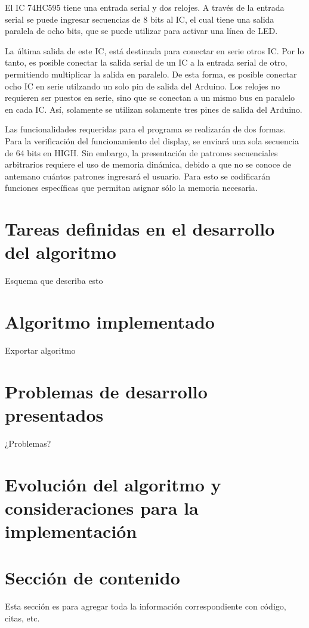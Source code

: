 \documentclass{article}
\begin{document}
El IC 74HC595 tiene una entrada serial y dos relojes. A través de la entrada serial se puede ingresar secuencias de 8 bits al IC, el cual  tiene una salida paralela de ocho bits, que se puede utilizar para activar una línea de LED.

La última salida de este IC, está destinada para conectar en serie otros IC. Por lo tanto, es posible conectar la salida serial de un IC a la entrada serial de otro, permitiendo multiplicar la salida en paralelo. De esta forma, es posible conectar ocho IC en serie utilzando un solo pin de salida del Arduino. 
Los relojes no requieren ser puestos en serie, sino que se conectan a un mismo bus en paralelo en cada IC. Así, solamente se utilizan solamente tres pines de salida del Arduino.

Las funcionalidades requeridas para el programa se realizarán de dos formas. Para la verificación del funcionamiento del display, se enviará una sola secuencia de 64 bits en HIGH. Sin embargo, la presentación de patrones secuenciales arbitrarios requiere el uso de memoria dinámica, debido a que no se conoce de antemano cuántos patrones ingresará el usuario. Para esto se codificarán funciones específicas que permitan asignar sólo la memoria necesaria.

\section{Tareas definidas en el desarrollo del algoritmo}

Esquema que describa esto

\section{Algoritmo implementado}

Exportar algoritmo

\section{Problemas de desarrollo presentados}

¿Problemas?

\section{Evolución del algoritmo y consideraciones para la implementación}



\section{Sección de contenido} \label{contenido}
Esta sección es para agregar toda la información correspondiente con código, citas, etc.
\end{document}
